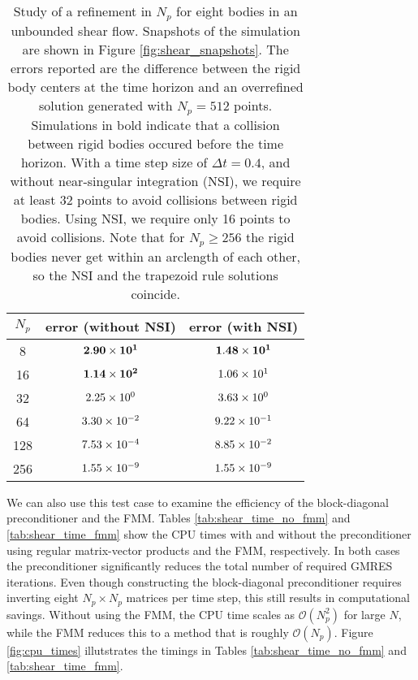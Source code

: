 \begin{table}[!h]\caption[Convergence study of multiple fibers in shear flow]{Study of a refinement in $N_p$ for eight bodies in an unbounded shear flow. Snapshots of the simulation are shown in Figure \ref{fig:shear_snapshots}. The errors reported are the difference between the rigid body centers at the time horizon and an overrefined solution generated with $N_p = 512$ points. Simulations in bold indicate that a collision between rigid bodies occured before the time horizon. With a time step size of $\Delta t = 0.4$, and without near-singular integration (NSI), we require at least 32 points to avoid collisions between rigid bodies. Using NSI, we require only 16 points to avoid collisions. Note that for $N_p \geq 256$ the rigid bodies never get within an arclength of each other, so the NSI and the trapezoid rule solutions coincide.}\label{tab:shear_convergence}
\begin{center}
\begin{tabular}{c | c | c  }
	$N_p$ & error (without NSI) & error (with NSI)
     	 \\
	\hline
	8 & $\mathbf{2.90\times 10^{1}}$ & $\mathbf{1.48\times 10^{1}}$\\
	16 & $\mathbf{1.14\times 10^{2}}$ & $1.06\times 10^{1}$\\
	32 &  $2.25\times 10^{0}$  & $3.63\times 10^{0}$\\
	64 & $3.30\times 10^{-2}$ & $9.22\times 10^{-1}$\\
	128 &  $7.53\times 10^{-4}$ & $8.85\times 10^{-2}$\\
	256 &   $1.55\times 10^{-9}$ & $1.55\times 10^{-9}$
\end{tabular}
\end{center}
\end{table}


We can also use this test case to examine the efficiency of the block-diagonal preconditioner and the FMM. Tables \ref{tab:shear_time_no_fmm} and \ref{tab:shear_time_fmm} show the CPU times with and without the preconditioner using regular matrix-vector products and the FMM, respectively. In both cases the preconditioner significantly reduces the total number of required GMRES iterations. Even though constructing the block-diagonal preconditioner requires inverting eight $N_p\times N_p$ matrices per time step, this still results in computational savings. Without using the FMM, the CPU time scales as $\mathcal{O}(N_p^2)$ for large $N$, while the FMM reduces this to a method that is roughly $\mathcal{O}(N_p)$. Figure \ref{fig:cpu_times} illutstrates the timings in Tables \ref{tab:shear_time_no_fmm} and \ref{tab:shear_time_fmm}.

